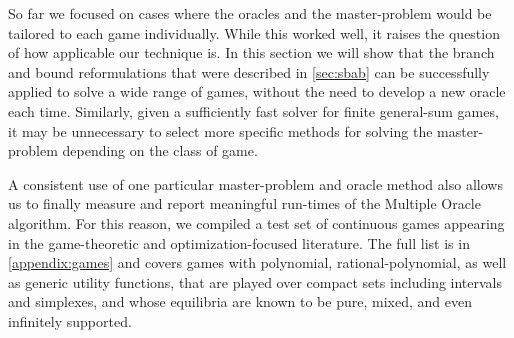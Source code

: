 

So far we focused on cases where the oracles and the master-problem would be tailored to each game individually. While this worked well, it raises the question of how applicable our technique is. In this section we will show that the branch and bound reformulations that were described in \cref{sec:sbab} can be successfully applied to solve a wide range of games, without the need to develop a new oracle each time. Similarly, given a sufficiently fast solver for finite general-sum games, it may be unnecessary to select more specific methods for solving the master-problem depending on the class of game. 

A consistent use of one particular master-problem and oracle method also allows us to finally measure and report meaningful run-times of the Multiple Oracle algorithm. For this reason, we compiled a test set of continuous games appearing in the game-theoretic and optimization-focused literature. The full list is in \cref{appendix:games} and covers 
games with polynomial, rational-polynomial, as well as generic utility functions, that are played over compact sets including intervals and simplexes, and whose equilibria are known to be pure, mixed, and even infinitely supported.
